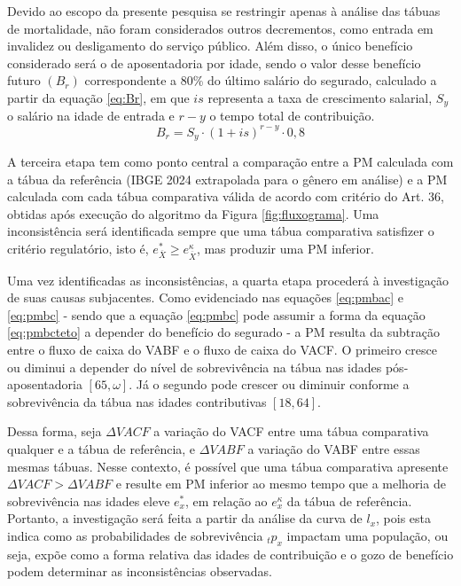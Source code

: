Devido ao escopo da presente pesquisa se restringir apenas à análise das tábuas de mortalidade, não foram considerados outros decrementos, como entrada em invalidez ou desligamento do serviço público. Além disso, o único benefício considerado será o de aposentadoria por idade, sendo o valor desse benefício futuro $(B_r)$ correspondente a 80\% do último salário do segurado, calculado a partir da equação \ref{eq:Br}, em que $is$ representa a taxa de crescimento salarial, $S_y$ o salário na idade de entrada e $r-y$ o tempo total de contribuição. 
\begin{equation}
    B_r = S_y \cdot (1+is)^{r-y} \cdot 0,8
    \label{eq:Br}
\end{equation}

A terceira etapa tem como ponto central a comparação entre a PM calculada com a tábua da referência (IBGE 2024 extrapolada para o gênero em análise) e a PM calculada com cada tábua comparativa válida de acordo com critério do Art. 36, obtidas após execução do algoritmo da Figura \ref{fig:fluxograma}. Uma inconsistência será identificada sempre que uma tábua comparativa satisfizer o critério regulatório, isto é, $e^{*}_{\overline{X}} \geq e^{\kappa}_{\overline{X}}$, mas produzir uma PM inferior.

Uma vez identificadas as inconsistências, a quarta etapa procederá à investigação de suas causas subjacentes. Como evidenciado nas equações \ref{eq:pmbac} e \ref{eq:pmbc} - sendo que a equação \ref{eq:pmbc} pode assumir a forma da equação \ref{eq:pmbcteto} a depender do benefício do segurado - a PM resulta da subtração entre o fluxo de caixa do VABF e o fluxo de caixa do VACF. O primeiro cresce ou diminui a depender do nível de sobrevivência na tábua nas idades pós-aposentadoria $[65, \omega]$. Já o segundo pode crescer ou diminuir conforme a sobrevivência da tábua nas idades contributivas $[18, 64]$.

Dessa forma, seja $\Delta VACF$ a variação do VACF entre uma tábua comparativa qualquer e a tábua de referência, e $\Delta VABF$ a variação do VABF entre essas mesmas tábuas. Nesse contexto, é possível que uma tábua comparativa apresente $\Delta VACF > \Delta VABF$ e resulte em PM inferior ao mesmo tempo que a melhoria de sobrevivência nas idades eleve $e^{*}_x$, em relação ao $e^{\kappa}_x$ da tábua de referência. Portanto, a investigação será feita a partir da análise da curva de $l_x$, pois esta indica como as probabilidades de sobrevivência ${}_{t}p_{x}$ impactam uma população, ou seja, expõe como a forma relativa das idades de contribuição e o gozo de benefício podem determinar as inconsistências observadas.

